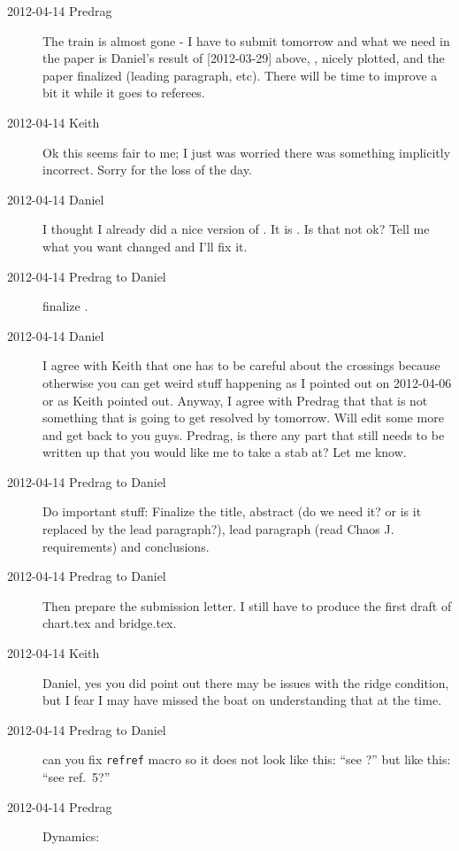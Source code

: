 \begin{description}
\item[2012-04-14 Predrag] The train is almost gone - I have to submit
tomorrow and what we need in the paper is Daniel's result of [2012-03-29]
above, , nicely plotted, and the paper finalized
(leading paragraph, etc). There will be time to improve a bit it while it
goes to referees.

\item[2012-04-14 Keith] Ok this seems fair to me; I just was worried
there was something implicitly incorrect.  Sorry for the loss of the day.

\item[2012-04-14 Daniel] I thought I already did a nice version of
. It is . Is that not ok?
Tell me what you want changed and I'll fix it.

\item[2012-04-14 Predrag to Daniel] finalize .

\item[2012-04-14 Daniel]
I agree with Keith that one has to be careful about the crossings because
otherwise you can get weird stuff happening as I pointed out on
2012-04-06 or as Keith pointed out. Anyway, I agree with Predrag that
that is not something that is going to get resolved by tomorrow. Will
edit some more and get back to you guys. Predrag, is there any part that
still needs to be written up that you would like me to take a stab at?
Let me know.

\item[2012-04-14 Predrag to Daniel] Do important stuff: Finalize the
title, abstract (do we need it? or is it replaced by the lead
paragraph?), lead paragraph (read Chaos J. requirements) and conclusions.

\item[2012-04-14 Predrag to Daniel] Then prepare the submission letter. I
still have to produce the first draft of chart.tex and bridge.tex.

\item[2012-04-14 Keith] Daniel, yes you did point out there may be issues
with the ridge condition, but I fear I may have missed the boat on
understanding that at the time.

\item[2012-04-14 Predrag to Daniel] can you fix \texttt{refref} macro so
it does not look like this:
``see ?''
but like this: ``see ref.~5?''

\item[2012-04-14 Predrag]       \toCB
{}
{Dynamics}:


\end{description}
